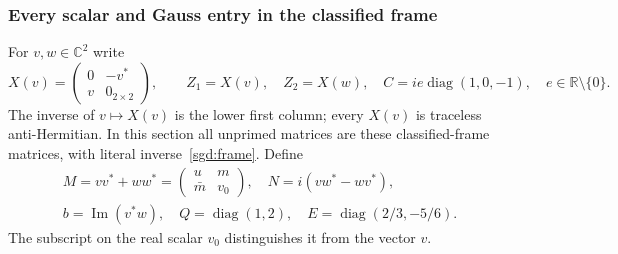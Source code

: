 \subsubsection{Every scalar and Gauss entry in the classified frame}

For $v,w\in\mathbb C^2$ write
\[
 X(v)=\begin{pmatrix}0&-v^*\\v&0_{2\times2}\end{pmatrix},\qquad
 Z_1=X(v),\quad Z_2=X(w),\quad
 C=ie\operatorname{diag}(1,0,-1),\quad e\in\mathbb R\setminus\{0\}.
\]
The inverse of $v\mapsto X(v)$ is the lower first column; every
$X(v)$ is traceless anti-Hermitian. In this section all unprimed matrices
are these classified-frame matrices, with literal inverse~\eqref{sgd:frame}.
Define
\[
 \begin{gathered}
 M=vv^*+ww^*=\begin{pmatrix}u&m\\\bar m&v_0\end{pmatrix},\quad
 N=i(vw^*-wv^*),\\
 b=\operatorname{Im}(v^*w),\quad
 Q=\operatorname{diag}(1,2),\quad E=\operatorname{diag}(2/3,-5/6).
 \end{gathered}
\]
The subscript on the real scalar $v_0$ distinguishes it from the vector $v$.

